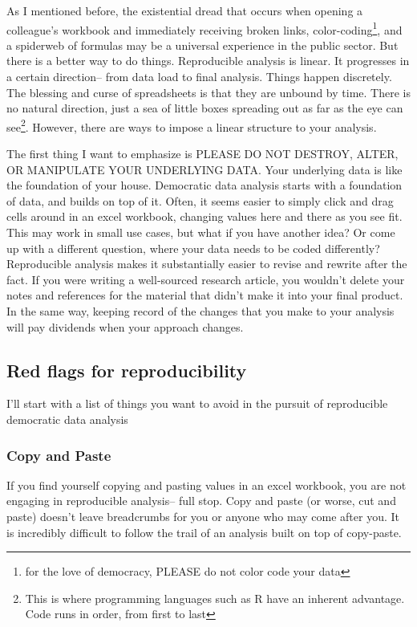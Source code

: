 \documentclass[
]{book}
\begin{document}
As I mentioned before, the existential dread that occurs when opening a colleague's workbook and immediately receiving broken links, color-coding\footnote{for the love of democracy, PLEASE do not color code your data}, and a spiderweb of formulas may be a universal experience in the public sector. But there is a better way to do things. Reproducible analysis is linear. It progresses in a certain direction-- from data load to final analysis. Things happen discretely. The blessing and curse of spreadsheets is that they are unbound by time. There is no natural direction, just a sea of little boxes spreading out as far as the eye can see\footnote{This is where programming languages such as R have an inherent advantage. Code runs in order, from first to last}. However, there are ways to impose a linear structure to your analysis.

The first thing I want to emphasize is PLEASE DO NOT DESTROY, ALTER, OR MANIPULATE YOUR UNDERLYING DATA. Your underlying data is like the foundation of your house. Democratic data analysis starts with a foundation of data, and builds on top of it. Often, it seems easier to simply click and drag cells around in an excel workbook, changing values here and there as you see fit. This may work in small use cases, but what if you have another idea? Or come up with a different question, where your data needs to be coded differently? Reproducible analysis makes it substantially easier to revise and rewrite after the fact. If you were writing a well-sourced research article, you wouldn't delete your notes and references for the material that didn't make it into your final product. In the same way, keeping record of the changes that you make to your analysis will pay dividends when your approach changes.

\hypertarget{red-flags-for-reproducibility}{%
\subsection{Red flags for reproducibility}\label{red-flags-for-reproducibility}}

I'll start with a list of things you want to avoid in the pursuit of reproducible democratic data analysis

\hypertarget{copy-and-paste}{%
\subsubsection{Copy and Paste}\label{copy-and-paste}}

If you find yourself copying and pasting values in an excel workbook, you are not engaging in reproducible analysis-- full stop. Copy and paste (or worse, cut and paste) doesn't leave breadcrumbs for you or anyone who may come after you. It is incredibly difficult to follow the trail of an analysis built on top of copy-paste.
\end{document}
